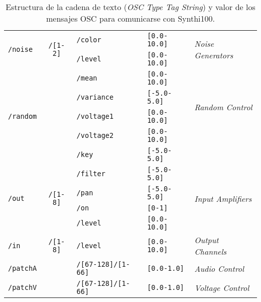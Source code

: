 \begin{table}
\begin{center}
\begin{tabular}{ l c l l l }
			\hline
			\multirow{2}{*}{\texttt{/noise}}	& \multirow{2}{*}{\texttt{/[1-2]}}	& \texttt{/color}	&\texttt{[0.0-10.0]} & \multirow{2}{*}{\textit{Noise Generators}}\\
			& & \texttt{/level} &\texttt{[0.0-10.0]}& \\
			\hline
			
			\hline
			\multirow{5}{*}{\texttt{/random}}	& 	& \texttt{/mean}	&\texttt{[0.0-10.0]} \\
			& & \texttt{/variance} &\texttt{[-5.0-5.0]}&  \multirow{2}{*}{\textit{Random Control}}\\
			& & \texttt{/voltage1} &\texttt{[0.0-10.0]}& \multirow{2}{*}{\textit{Voltage Generator}}\\
			& & \texttt{/voltage2} &\texttt{[0.0-10.0]}& \\
			& & \texttt{/key} &\texttt{[-5.0-5.0]}& \\
			\hline
			
			\multirow{4}{*}{\texttt{/out}}	& \multirow{4}{*}{\texttt{/[1-8]}}	& \texttt{/filter}	&\texttt{[-5.0-5.0]} & \multirow{4}{*}{\textit{Input Amplifiers}}\\
			& & \texttt{/pan} & \texttt{[-5.0-5.0]} & \\
			& & \texttt{/on} & \texttt{[0-1]} & \\
			& & \texttt{/level} & \texttt{[0.0-10.0]} &\\
			\hline
			
			\multirow{1}{*}{\texttt{/in}}	& \multirow{1}{*}{\texttt{/[1-8]}}	& \texttt{/level}	&\texttt{[0.0-10.0]} & \multirow{1}{*}{\textit{Output Channels}}\\
			\hline
			
			\multirow{1}{*}{\texttt{/patchA}}	& 	
			& \texttt{/[67-128]/[1-66]} 	&\texttt{[0.0-1.0]} & \multirow{1}{*}{\textit{Audio Control}}\\
			\hline
			
			\multirow{1}{*}{\texttt{/patchV}}	& 	
			& \texttt{/[67-128]/[1-66]} 	&\texttt{[0.0-1.0]} & \multirow{1}{*}{\textit{Voltage Control}}\\
			\hline
			
		\end{tabular}
		\caption[Estructura de los mensajes OSC]{Estructura de la cadena de texto (\textit{OSC Type Tag String}) y valor de los mensajes OSC para comunicarse con Synthi100.}
		\label{table:osc}
	\end{center}
\end{table}